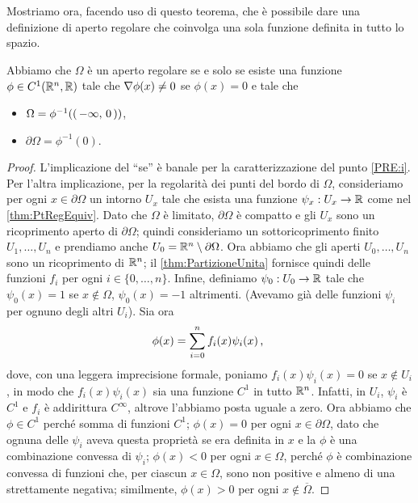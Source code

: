 Mostriamo ora, facendo uso di questo teorema, che è possibile dare una definizione di aperto regolare che coinvolga una sola funzione definita in tutto lo spazio.

\begin{lemma}\label{lemma:EquivRegolare}
	Abbiamo che $\Omega$ è un aperto regolare se e solo se esiste una funzione $\phi\in C^1(\mathbb R^n,\mathbb R)$ tale che $\nabla \phi(x)\neq 0$ se $\phi(x)=0$ e tale che
	\begin{itemize}
		\item $\Omega = \phi^{-1}(\left(\,-\infty,\,0\,\right))$,
		\item $\partial \Omega = \phi^{-1}(0)$.
	\end{itemize}
\end{lemma}

\begin{proof}
	L'implicazione del ``se'' è banale per la caratterizzazione del punto \ref{PRE:i}. Per l'altra implicazione, per la regolarità dei punti
	del bordo di $\Omega$, consideriamo per ogni $x\in\partial \Omega$ un intorno $U_x$ tale che esista una funzione $\psi_x:U_x\rightarrow \mathbb R$
	come nel \cref{thm:PtRegEquiv}. Dato che $\Omega$ è limitato, $\partial\Omega$ è compatto e gli $U_x$ sono un ricoprimento aperto di $\partial \Omega$;
	quindi consideriamo un sottoricoprimento finito $U_1, \dots, U_n$  e prendiamo anche $U_0 = \mathbb R^n \setminus \partial \Omega$.
	Ora abbiamo che gli aperti $U_0,\dots,U_n$ sono un ricoprimento di $\mathbb R^n$;
	il \cref{thm:PartizioneUnita} fornisce quindi delle funzioni $f_i$ per ogni $i\in\{0,\dots, n\}$.
	Infine, definiamo $\psi_0:U_0\rightarrow \mathbb R$ tale che $\psi_0(x)=1$ se $x\notin \Omega$, $\psi_0(x)=-1$ altrimenti. (Avevamo già delle funzioni $\psi_i$ per ognuno degli altri $U_i$). Sia ora 
	\[
		\phi(x)=\sum_{i=0}^n f_i(x) \psi_i(x)\, \text{, }
	\]
	dove, con una leggera imprecisione formale, poniamo $f_i(x) \psi_i(x) = 0$ se $x\notin U_i$, in modo che $f_i(x) \psi_i(x)$ sia una funzione
	$C^1$ in tutto $\mathbb R^n$. Infatti, in $U_i$, $\psi_i$ è $C^1$ e $f_i$ è addirittura $C^{\infty}$, altrove l'abbiamo posta uguale a zero.
	Ora abbiamo che $\phi\in C^1$ perché somma di funzioni $C^1$; $\phi(x)=0$ per ogni $x\in \partial\Omega$, dato che ognuna delle
	$\psi_i$ aveva questa proprietà se era definita in $x$ e la $\phi$ è una combinazione convessa di $\psi_i$;
	$\phi(x)<0$ per ogni $x \in \Omega$, perché $\phi$ è combinazione convessa di funzioni che, per ciascun $x\in\Omega$, sono non positive e
	almeno di una strettamente negativa; similmente, $\phi(x)>0$ per ogni $x \notin \overline\Omega$.
	

\end{proof}
